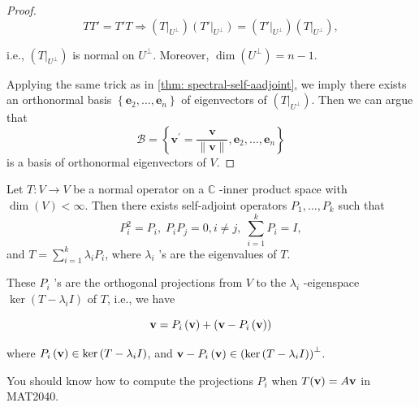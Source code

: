 \begin{proof}
\[
TT' = T'T \Rightarrow  \left( {\left. T\right| }_{{U}^{ \bot  }}\right) \left( {T'{\left. \right| }_{{U}^{ \bot  }}}\right)  = \left( {\left. T'\right| }_{{U}^{ \bot  }}\right) \left( {\left. T\right| }_{{U}^{ \bot  }}\right),
\]

i.e., \(\left( {\left. T\right| }_{{U}^{ \bot  }}\right)\) is normal on \({U}^{ \bot  }\). Moreover, \(\dim \left( {U}^{ \bot  }\right)  = n - 1\).

Applying the same trick as in \autoref{thm: spectral-self-aadjoint}, we imply there exists an orthonormal basis \(\left\{  {{\mathbf{e}}_{2},\ldots,{\mathbf{e}}_{n}}\right\}\) of eigenvectors of \(\left( {\left. T\right| }_{{U}^{ \bot  }}\right)\). Then we can argue that
\[
\mathcal{B} = \left\{  {{\mathbf{v}}^{\prime } = \frac{\mathbf{v}}{\parallel \mathbf{v}\parallel},{\mathbf{e}}_{2},\ldots,{\mathbf{e}}_{n}}\right\}
\]
is a basis of orthonormal eigenvectors of \(V\).
\end{proof}

\begin{corollary}\label{cor:spectral-theorem-normal-operators}
Let \(T : V \rightarrow  V\) be a normal operator on a \(\mathbb{C}\) -inner product space with \(\dim \left( V\right)  < \infty\). Then there exists self-adjoint operators \({P}_{1},\ldots,{P}_{k}\) such that
\[
{P}_{i}^{2} = {P}_{i},\;{P}_{i}{P}_{j} = 0,i \neq  j,\;\mathop{\sum }\limits_{{i = 1}}^{k}{P}_{i} = I,
\]
and \(T = \mathop{\sum }\limits_{{i = 1}}^{k}{\lambda }_{i}{P}_{i}\), where \({\lambda }_{i}\) ’s are the eigenvalues of \(T\).

These \({P}_{i}\) ’s are the orthogonal projections from \(V\) to the \(\lambda_{i}\) -eigenspace \(\ker (T - \lambda_{i}I)\) of \(T\), i.e., we have

\[
{\bf v} = {P}_{i}\left({\bf  v}\right)  + \left( {{\bf v} - {P}_{i}\left({\bf  v}\right) }\right)
\]

where \({P}_{i}\left({\bf  v}\right)  \in  \ker \left( {T - {\lambda }_{i}I}\right)\), and \({\bf v} - {P}_{i}\left({\bf  v}\right)  \in  {\left( \ker \left( T - {\lambda }_{i}I\right) \right) }^{ \bot  }\).
\end{corollary}
You should know how to compute the projections \( P_i \) when \( T({\bf v}) = A{\bf v} \) in MAT2040.

